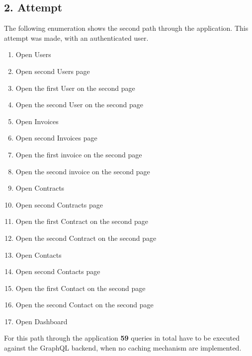 \subsection{2. Attempt}

The following enumeration shows the second path through the application. This attempt was made, with an authenticated user.

\begin{enumerate}
    \item Open Users
    \item Open second Users page
    \item Open the first User on the second page
    \item Open the second User on the second page
    \item Open Invoices
    \item Open second Invoices page
    \item Open the first invoice on the second page
    \item Open the second invoice on the second page
    \item Open Contracts
    \item Open second Contracts page
    \item Open the first Contract on the second page
    \item Open the second Contract on the second page
    \item Open Contacts
    \item Open second Contacts page
    \item Open the first Contact on the second page
    \item Open the second Contact on the second page
    \item Open Dashboard
\end{enumerate}

For this path through the application \textbf{59} queries in total have to be executed against the
GraphQL backend, when no caching mechanism are implemented.

